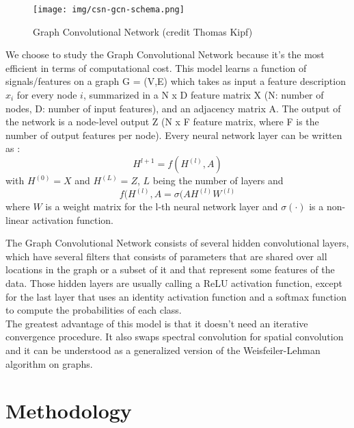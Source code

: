 \documentclass[a4paper]{article}
\begin{document}
\begin{figure}[H]
    \centering
    \texttt{[image: img/csn-gcn-schema.png]}
    \caption{Graph Convolutional Network (credit Thomas Kipf)}\label{fig:gcn}
\end{figure}

We choose to study the Graph Convolutional Network because it's the most efficient in terms of computational cost. This model learns a function of signals/features on a graph G = (V,E) which takes as input a feature description $x_i$ for every node $i$, summarized in a N x D feature matrix X (N: number of nodes, D: number of input features), and an adjacency matrix A. The output of the network is a node-level output Z (N x F feature matrix, where F is the number of output features per node). Every neural network layer can be written as :
$$H^{l+1} = f(H^{(l)}, A)$$
with $H^{(0)} = X$ and $H^{(L)} = Z$, $L$ being the number of layers and 
$$ f(H^{(l)},A = \sigma(AH^{(l)}W^{(l)}$$
where $W$ is a weight matrix for the l-th neural network layer  and $\sigma(·)$ is a non-linear activation function.

The Graph Convolutional Network consists of several hidden convolutional layers, which have several filters that consists of parameters that are shared over all locations in the graph or a subset of it and that represent some features of the data. Those hidden layers are usually calling a ReLU activation function, except for the last layer that uses an identity activation function and a softmax function to compute the probabilities of each class. \\
The greatest advantage of this model is that it doesn't need an iterative convergence procedure. It also swaps spectral convolution for spatial convolution and it can be understood as a generalized version of the Weisfeiler-Lehman algorithm on graphs.



\section{Methodology} \label{method}
\end{document}
